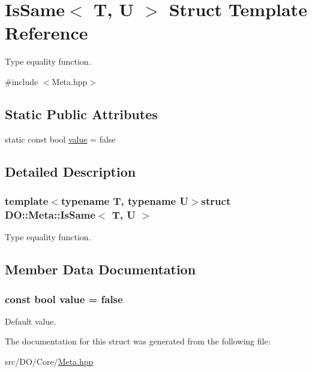 \hypertarget{struct_d_o_1_1_meta_1_1_is_same}{\section{Is\-Same$<$ T, U $>$ Struct Template Reference}
\label{struct_d_o_1_1_meta_1_1_is_same}
}


Type equality function.  




{\ttfamily \#include $<$Meta.\-hpp$>$}

\subsection*{Static Public Attributes}
\begin{DoxyCompactItemize}
\item 
static const bool \hyperlink{struct_d_o_1_1_meta_1_1_is_same_a11ddd051208250c32dc4985abcafa86d}{value} = false
\end{DoxyCompactItemize}


\subsection{Detailed Description}
\subsubsection*{template$<$typename T, typename U$>$struct D\-O\-::\-Meta\-::\-Is\-Same$<$ T, U $>$}

Type equality function. 

\subsection{Member Data Documentation}
\hypertarget{struct_d_o_1_1_meta_1_1_is_same_a11ddd051208250c32dc4985abcafa86d}{
\subsubsection[{value}]{\setlength{\rightskip}{0pt plus 5cm}const bool value = false\hspace{0.3cm}{\ttfamily [static]}}}\label{struct_d_o_1_1_meta_1_1_is_same_a11ddd051208250c32dc4985abcafa86d}
Default value. 

The documentation for this struct was generated from the following file\-:\begin{DoxyCompactItemize}
\item 
src/\-D\-O/\-Core/\hyperlink{_meta_8hpp}{Meta.\-hpp}\end{DoxyCompactItemize}
